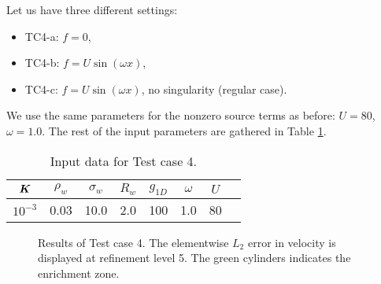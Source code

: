 Let us have three different settings: 
\begin{itemize}
    \item TC4-a: $f=0$,
    \item TC4-b: $f=U\sin(\omega x)$,
    \item TC4-c: $f=U\sin(\omega x)$, no singularity (regular case).
\end{itemize}
We use the same parameters for the nonzero source terms as before: $U=80$, $\omega=1.0$.
The rest of the input parameters are gathered in Table \ref{tab:tc4_data}.
%
\begin{table}[!htb]
\begin{center}
\begin{tabular}{cccccccc}
\toprule
$\mathbf{\boldsymbol{K}}$ & $\rho_w$ & $\sigma_w$ & $R_w$ & $g_{1D}$ & $\omega$ & $U$ \\
\midrule
$10^{-3}$ & 0.03 & 10.0 & 2.0 & 100 & 1.0 & 80\\
\bottomrule
\end{tabular}
\caption{Input data for Test case 4.}
\label{tab:tc4_data}
\end{center}
\end{table}
%
\begin{figure}[!htb]
    \centering
    \caption[Error distribution in Test case 4.]
    {Results of Test case 4. The elementwise $L_2$ error in velocity is displayed at refinement level 5.
    The green cylinders indicates the enrichment zone. }
    \label{fig:mh_tc4_error}
\end{figure}

